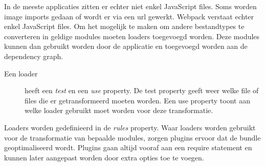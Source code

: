 In de meeste applicaties zitten er echter niet enkel JavaScript files. Soms worden image imports gedaan of wordt er via een url gewerkt. Webpack verstaat echter enkel JavaScript files. Om het mogelijk te maken om andere bestandtypes te converteren in geldige modules moeten loaders toegevoegd worden. Deze modules kunnen dan gebruikt worden door de applicatie en toegevoegd worden aan de dependency graph.
\autocite{webpack} 

\begin{description}
	\item[Een loader] heeft een \textit{test} en een \textit{use} property. De test property geeft weer welke file of files die er getransformeerd moeten worden. Een use property toont aan welke loader gebruikt moet worden voor deze transformatie.
\end{description}

Loaders worden gedefinieerd in de \textit{rules} property.
Waar loaders worden gebruikt voor de transformatie van bepaalde modules, zorgen plugins ervoor dat de bundle geoptimaliseerd wordt. Plugins gaan altijd vooraf aan een require statement en kunnen later aangepast worden door extra opties toe te voegen. 


